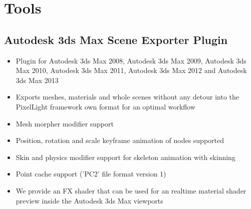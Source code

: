 \chapter{Tools}




\section{Autodesk 3ds Max Scene Exporter Plugin}
\begin{itemize}
\item{Plugin for Autodesk 3ds Max 2008, Autodesk 3ds Max 2009, Autodesk 3ds Max 2010, Autodesk 3ds Max 2011, Autodesk 3ds Max 2012 and Autodesk 3ds Max 2013}
\item{Exports meshes, materials and whole scenes without any detour into the PixelLight framework own format for an optimal workflow}
\item{Mesh morpher modifier support}
\item{Position, rotation and scale keyframe animation of nodes supported}
\item{Skin and physics modifier support for skeleton animation with skinning}
\item{Point cache support ('PC2' file format version 1)}
\item{We provide an FX shader that can be used for an realtime material shader preview inside the Autodesk 3ds Max viewports}
\end{itemize}
